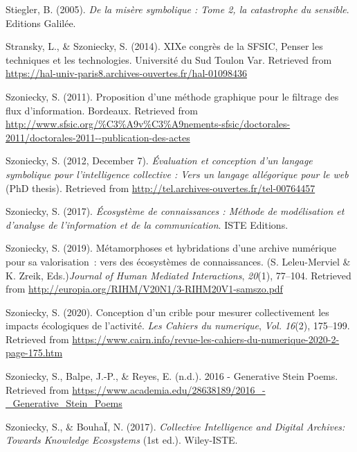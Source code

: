 \documentclass[
  a4paper,
  DIV=11,
  numbers=noendperiod]{scrreprt}
\newlength{\cslhangindent}
\newenvironment{CSLReferences}[2] %
 {\begin{list}{}{%
  \setlength{\itemindent}{0pt}
  \setlength{\leftmargin}{0pt}
  \setlength{\parsep}{0pt}
  \ifodd #1
   \setlength{\leftmargin}{\cslhangindent}
   \setlength{\itemindent}{-1\cslhangindent}
  \fi
  \setlength{\itemsep}{#2\baselineskip}}}
 {\end{list}}
\begin{document}
\begin{CSLReferences}{1}{0}
Stiegler, B. (2005). \emph{De la misère symbolique : Tome 2, la
catastrophe du sensible}. Editions Galilée.

Stransky, L., \& Szoniecky, S. (2014). XIXe congrès de la SFSIC, Penser
les techniques et les technologies. Université du Sud Toulon Var.
Retrieved from
\url{https://hal-univ-paris8.archives-ouvertes.fr/hal-01098436}

Szoniecky, S. (2011). Proposition d'une méthode graphique pour le
filtrage des flux d'information. Bordeaux. Retrieved from
\url{http://www.sfsic.org/\%C3\%A9v\%C3\%A9nements-sfsic/doctorales-2011/doctorales-2011--publication-des-actes}

Szoniecky, S. (2012, December 7). \emph{Évaluation et conception d'un
langage symbolique pour l'intelligence collective : Vers un langage
allégorique pour le web} (PhD thesis). Retrieved from
\url{http://tel.archives-ouvertes.fr/tel-00764457}

Szoniecky, S. (2017). \emph{Écosystème de connaissances : Méthode de
modélisation et d{'}analyse de l{'}information et de la communication}.
ISTE Editions.

Szoniecky, S. (2019). Métamorphoses et hybridations d{'}une archive
numérique pour sa valorisation~: vers des écosystèmes de connaissances.
(S. Leleu-Merviel \& K. Zreik, Eds.)\emph{Journal of Human Mediated
Interactions}, \emph{20}(1), 77--104. Retrieved from
\url{http://europia.org/RIHM/V20N1/3-RIHM20V1-samszo.pdf}

Szoniecky, S. (2020). Conception d{'}un crible pour mesurer
collectivement les impacts écologiques de l{'}activité. \emph{Les
Cahiers du numerique}, \emph{Vol. 16}(2), 175--199. Retrieved from
\url{https://www.cairn.info/revue-les-cahiers-du-numerique-2020-2-page-175.htm}

Szoniecky, S., Balpe, J.-P., \& Reyes, E. (n.d.). 2016 - Generative
Stein Poems. Retrieved from
\url{https://www.academia.edu/28638189/2016_-_Generative_Stein_Poems}

Szoniecky, S., \& BouhaÏ, N. (2017). \emph{Collective Intelligence and
Digital Archives: Towards Knowledge Ecosystems} (1st ed.). Wiley-ISTE.


\end{CSLReferences}
\end{document}
